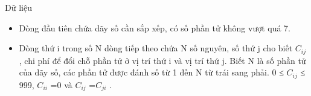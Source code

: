 Dữ liệu
\begin{itemize}
	\item Dòng đầu tiên chứa dãy số cần sắp xếp, có số phần tử không vượt quá 7.
	\item Dòng thứ i trong số N dòng tiếp theo chứa N số nguyên, số thứ j cho biết $C_{ij}$ , chi phí để đổi chỗ phần tử ở vị trí thứ i và vị trí thứ j. Biết N là số phần tử của dãy số, các phần tử được đánh số từ 1 đến N từ trái sang phải. 0 ≤ $C_{ij}$ ≤ 999, $C_{ii}$ =0 và $C_{ij}$ =$C_{ji}$ .
\end{itemize}